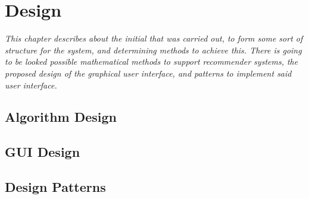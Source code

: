 \chapter{Design}

\textit{This chapter describes about the initial that was carried out, to form some sort of structure for the system, and determining methods to achieve this. There is going to be looked possible mathematical methods to support recommender systems, the proposed design of the graphical user interface, and patterns to implement said user interface.}

\section{Algorithm Design}
\label{AlgDes}

\section{GUI Design}
\label{GUIDes}

\section{Design Patterns}
\label{DesPatterns}
